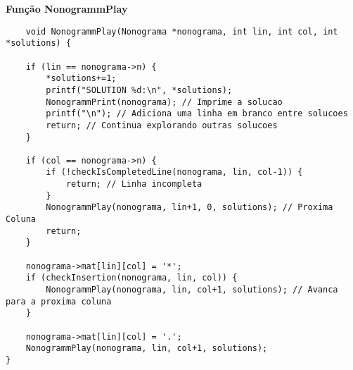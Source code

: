 \documentclass{article}
\begin{document}
\begin{center}
    \textbf{Função NonogrammPlay}
\end{center}
\begin{lstlisting}
    void NonogrammPlay(Nonograma *nonograma, int lin, int col, int *solutions) {

    if (lin == nonograma->n) {
        *solutions+=1;
        printf("SOLUTION %d:\n", *solutions);
        NonogrammPrint(nonograma); // Imprime a solucao
        printf("\n"); // Adiciona uma linha em branco entre solucoes
        return; // Continua explorando outras solucoes
    }

    if (col == nonograma->n) {
        if (!checkIsCompletedLine(nonograma, lin, col-1)) {
            return; // Linha incompleta
        }
        NonogrammPlay(nonograma, lin+1, 0, solutions); // Proxima Coluna
        return;
    }

    nonograma->mat[lin][col] = '*';
    if (checkInsertion(nonograma, lin, col)) {
        NonogrammPlay(nonograma, lin, col+1, solutions); // Avanca para a proxima coluna
    }

    nonograma->mat[lin][col] = '.';
    NonogrammPlay(nonograma, lin, col+1, solutions);
}
\end{lstlisting}
\end{document}
